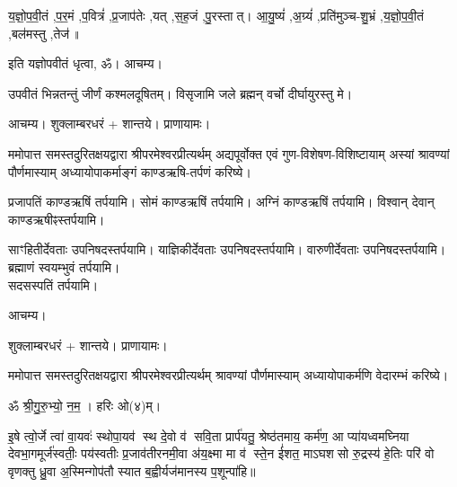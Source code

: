 
य॒ज्ञो॒प॒वी॒तं \sep प॒र॒मं \sep प॒वित्रं॑ \sep प्र॒जाप॑तेः \sep यत् \sep स॒ह॒जं \sep पु॒रस्तात्। आ॒यु॒ष्यं॑ \sep अ॒ग्र्यं॑ \sep प्रति॑मुञ्च-शु॒भ्रं \sep य॒ज्ञो॒प॒वी॒तं \sep बल॑मस्तु \sep तेज॑॥

इति यज्ञोपवीतं धृत्वा, ॐ। आचम्य।

उपवीतं भिन्नतन्तुं जीर्णं कश्मलदूषितम्। विसृजामि जले ब्रह्मन् वर्चो दीर्घायुरस्तु मे।



आचम्य। शुक्लाम्बरधरं + शान्तये। प्राणायामः।

ममोपात्त समस्तदुरितक्षयद्वारा श्रीपरमेश्वरप्रीत्यर्थम्
अद्य\-पूर्वोक्त एवं गुण-विशेषण-विशिष्टायाम्
अस्यां श्रावण्यां पौर्णमास्याम् अध्यायोपाकर्माङ्गं काण्डऋषि-तर्पणं करिष्ये।


प्रजापतिं काण्डऋषिं तर्पयामि। 
सोमं काण्डऋषिं तर्पयामि। 
अग्निं काण्डऋषिं तर्पयामि। 
विश्वान् देवान् काण्डऋषीꣴ\-स्तर्पयामि।

साꣳहितीर्देवताः उपनिषद\-स्तर्पयामि। 
याज्ञिकीर्देवताः उपनिषद\-स्तर्पयामि। 
वारुणीर्देवताः उपनिषद\-स्तर्पयामि। 
ब्रह्माणं स्वयम्भुवं तर्पयामि। %
\\
सदसस्पतिं तर्पयामि।

आचम्य।




शुक्लाम्बरधरं + शान्तये। प्राणायामः।

ममोपात्त समस्तदुरितक्षयद्वारा श्रीपरमेश्वरप्रीत्यर्थम्
श्रावण्यां पौर्णमास्याम् अध्यायोपाकर्मणि वेदारम्भं करिष्ये।


ॐ श्री॒गु॒रु॒भ्यो॒ न॒म॒। हरिः ओ(४)म्।

इ॒षे त्वो॒र्जे त्वा॑ वा॒यवः॑ स्थोपा॒यव॑ स्थ दे॒वो व॑ सवि॒ता प्रार्प॑यतु॒ श्रेष्ठ॑तमाय॒ कर्म॑ण॒ आ
प्या॑यध्वमघ्निया देवभा॒गमूर्ज॑स्वतीः॒ पय॑स्वतीः प्र॒जाव॑तीरनमी॒वा अ॑य॒क्ष्मा मा व॑ स्ते॒न ई॑शत॒
माऽघशसो रु॒द्रस्य॑ हे॒तिः परि॑ वो वृणक्तु ध्रु॒वा अ॒स्मिन्गोप॑तौ स्यात ब॒ह्वीर्यज॑मानस्य
प॒शून्पा॑हि॥ %

